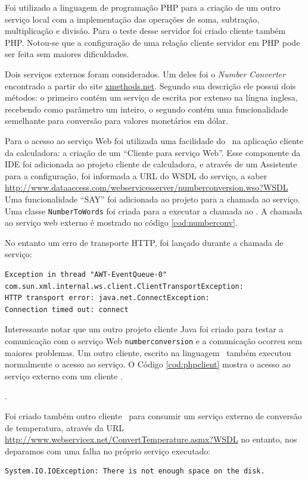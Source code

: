 Foi utilizado a linguagem de programação PHP para a criação de um outro serviço
local com a implementação das operações de soma, subtração, multiplicação e
divisão. Para o teste desse servidor foi criado cliente também PHP. Notou-se que
a configuração de uma relação cliente servidor em PHP pode ser feita sem maiores
dificuldades.

Dois serviços externos foram considerados. Um deles foi o \textit{Number
Converter} encontrado a partir do site \url{xmethods.net}. Segundo sua descrição
ele possui dois métodos: o primeiro contém um serviço de escrita por extenso na
língua inglesa, recebendo como parâmetro um inteiro, o segundo contém uma
funcionalidade semelhante para conversão para valores monetários em dólar.

Para o acesso ao serviço Web foi utilizada uma facilidade do \NetBeans\ na
aplicação cliente da calculadora: a criação de um ``Cliente para serviço Web''.
Esse componente da IDE foi adicionada ao projeto cliente de calculadora, e
através de um Assistente para a configuração, foi informada a URL do WSDL do
serviço, a saber
\url{http://www.dataaccess.com/webservicesserver/numberconversion.wso?WSDL} Uma
funcionalidade ``SAY'' foi adicionada ao projeto para a chamada ao serviço. Uma
classe \texttt{NumberToWords} foi criada para a executar a chamada ao
\WebService. A chamada ao serviço web externo é mostrado no código
\ref{cod:numberconv}.



No entanto um erro de transporte HTTP, foi lançado durante a chamada de serviço:

\begin{lstlisting}
Exception in thread "AWT-EventQueue-0" 
com.sun.xml.internal.ws.client.ClientTransportException: 
HTTP transport error: java.net.ConnectException: 
Connection timed out: connect
\end{lstlisting}

Interessante notar que um outro projeto cliente Java foi criado para testar a
comunicação com o serviço Web \texttt{numberconversion} e a comunicação ocorreu
sem maiores problemas.  Um outro cliente, escrito na linguagem \php\ também
executou normalmente o acesso ao serviço. O Código \ref{cod:phpclient} mostra o
acesso ao serviço externo com um cliente \php. 

.

Foi criado também outro cliente \php\ para consumir um serviço externo de
conversão de temperatura, através da URL
\url{http://www.webservicex.net/ConvertTemperature.asmx?WSDL} no entanto, nos
deparamos com uma falha no próprio serviço executado:

\begin{lstlisting}
System.IO.IOException: There is not enough space on the disk.
\end{lstlisting}

